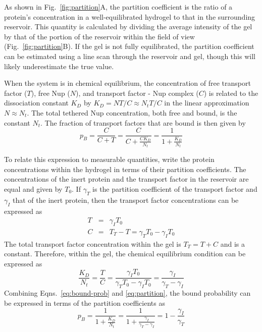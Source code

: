 As shown in Fig.~\ref{fig:partition}A, the partition coefficient is the ratio of a protein's concentration in a well-equilibrated hydrogel to that in the surrounding reservoir.  This quantity is calculated by dividing the average intensity of the gel by that of the portion of the reservoir within the field of view (Fig.~\ref{fig:partition}B).  If the gel is not fully equilibrated, the partition coefficient can be estimated using a line scan through the reservoir and gel, though this will likely underestimate the true value.

When the system is in chemical equilibrium, the concentration of free transport factor ($T$), free Nup ($N$), and transport factor - Nup complex ($C$) is related to the dissociation constant $K_D$ by
$K_D = NT/C \approx N_tT/C$ in the linear approximation $N \approx N_t$.   The total tethered Nup concentration, both free and bound, is the constant $N_t$.  The fraction of transport factors that are bound is then given by
\begin{equation}
p_B = \frac{C}{C+T} = \frac{C}{C+\frac{CK_D}{N_t}} = \frac{1}{1+\frac{K_D}{N_t}} %
\label{eq:bound-prob}
\end{equation} %

To relate this expression to measurable quantities, write the protein concentrations within the hydrogel in terms of their partition coefficients. The concentrations of the inert protein and the transport factor in the reservoir are equal and given by $T_0$.  If $\gamma_T$ is the partition coefficient of the transport factor and $\gamma_I$ that of the inert protein, then the transport factor concentrations can be expressed as
\begin{eqnarray}
T &=& \gamma_I T_0\\
C & =& T_T - T = \gamma_TT_0 - \gamma_I T_0
\label{eq:gamma}
\end{eqnarray} 
The total transport factor concentration within the gel is $T_T = T + C$ and is a constant.
Therefore, within the gel, the chemical equilibrium condition can be expressed as
\begin{equation}
\frac{K_D}{N_t} = \frac{T}{C} = \frac{\gamma_I T_0}{\gamma_T T_0 - \gamma_I T_0} = \frac{\gamma_I}{\gamma_T - \gamma_I}
\label{eq:partition}
\end{equation}
Combining Eqns.~\ref{eq:bound-prob} and \ref{eq:partition}, the bound probability can be expressed in terms of the partition coefficients as
\begin{equation}
p_B= \frac{1}{1+\frac{K_D}{N_t}} = \frac{1}{1+\frac{\gamma_I}{\gamma_T - \gamma_I}} = 1 - \frac{\gamma_I}{\gamma_T}
\label{eq:bound-prob-final}
\end{equation}


